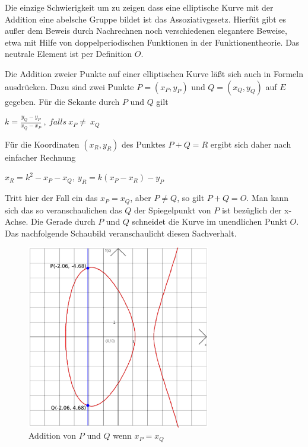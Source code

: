 \documentclass[a4paper,11pt]{article}
\begin{document}
Die einzige Schwierigkeit um zu zeigen dass eine elliptische Kurve mit der 
Addition eine abelsche Gruppe bildet ist das Assoziativgesetz. Hierfüt gibt es 
außer dem Beweis durch Nachrechnen noch verschiedenen elegantere Beweise, etwa
mit Hilfe von doppelperiodischen Funktionen in der Funktionentheorie. Das 
neutrale Element ist per Definition $O$. 

Die Addition zweier Punkte auf einer elliptischen Kurve läßt sich auch in 
Formeln ausdrücken. Dazu sind zwei Punkte $P=(x_P, y_P)$ und $Q=(x_Q, y_Q)$ auf 
$E$ gegeben. Für die Sekante durch $P$ und $Q$ gilt 
\begin{center}
$k=\frac{y_Q-y_P}{x_Q-x_P}\ ,\ falls\ x_P \neq\ x_Q$
\end{center}
Für die Koordinaten $(x_R, y_R)$  des Punktes $P+Q = R$ ergibt sich daher nach 
einfacher Rechnung
\begin{center}
$x_R = k^2 - x_P - x_Q,\ y_R = k(x_P - x_R)-y_P$
\end{center}
Tritt hier der Fall ein das $x_P = x_Q$, aber $P\neq Q$, so gilt $P+Q=O$. Man
kann sich das so veranschaulichen das $Q$ der Spiegelpunkt von $P$ ist bezüglich
der x-Achse. Die Gerade durch $P$ und $Q$ schneidet die Kurve im unendlichen 
Punkt $O$. Das nachfolgende Schaubild veranschaulicht diesen Sachverhalt.
\begin{figure}[ht]
\begin{center}
\includegraphics[width=8cm]{ec-3.eps}
\caption{Addition von $P$ und $Q$ wenn $x_P = x_Q$}
\end{center}
\end{figure}
\end{document}
